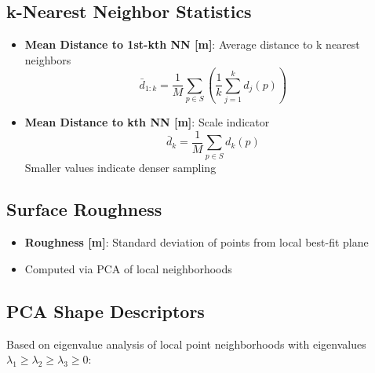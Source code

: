 \documentclass[12pt]{article}
\begin{document}
\subsection{k-Nearest Neighbor Statistics}
\begin{itemize}
    \item \textbf{Mean Distance to 1st-kth NN [m]}: Average distance to k nearest neighbors
    \begin{equation}
        \bar{d}_{1:k} = \frac{1}{M}\sum_{p \in S} \left(\frac{1}{k}\sum_{j=1}^{k} d_j(p)\right)
    \end{equation}

    \item \textbf{Mean Distance to kth NN [m]}: Scale indicator
    \begin{equation}
        \bar{d}_k = \frac{1}{M}\sum_{p \in S} d_k(p)
    \end{equation}
    Smaller values indicate denser sampling
\end{itemize}

\subsection{Surface Roughness}
\begin{itemize}
    \item \textbf{Roughness [m]}: Standard deviation of points from local best-fit plane
    \item Computed via PCA of local neighborhoods
\end{itemize}

\subsection{PCA Shape Descriptors}

Based on eigenvalue analysis of local point neighborhoods with eigenvalues $\lambda_1 \geq \lambda_2 \geq \lambda_3 \geq 0$:
\end{document}
